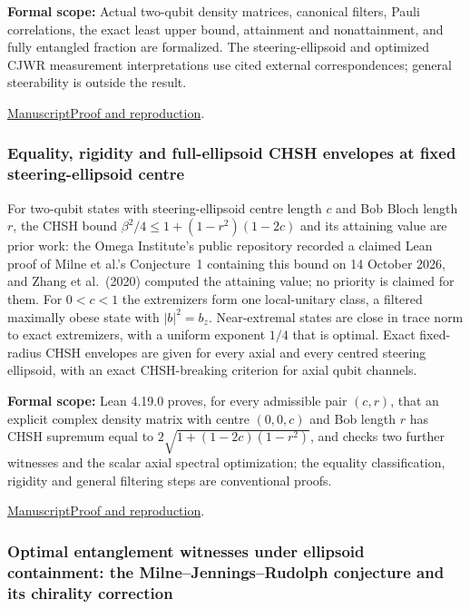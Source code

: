 \documentclass[11pt,a4paper]{article}
\begin{document}
\noindent\textbf{Formal scope:} Actual two-qubit density matrices, canonical filters, Pauli correlations, the exact least upper bound, attainment and nonattainment, and fully entangled fraction are formalized. The steering-ellipsoid and optimized CJWR measurement interpretations use cited external correspondences; general steerability is outside the result.

\href{https://github.com/dvgyl/math-and-theory/blob/main/papers/physics/steering-bounds/paper/steering_bounds.pdf}{Manuscript}\quad\href{https://github.com/dvgyl/math-and-theory/blob/main/papers/physics/steering-bounds/README.md}{Proof and reproduction}.

\subsubsection{Equality, rigidity and full-ellipsoid CHSH envelopes at fixed steering-ellipsoid centre}

For two-qubit states with steering-ellipsoid centre length $c$ and Bob Bloch length $r$, the CHSH bound $\beta^2/4\le1+(1-r^2)(1-2c)$ and its attaining value are prior work: the Omega Institute's public repository recorded a claimed Lean proof of Milne et al.'s Conjecture~1 containing this bound on 14 October 2026, and Zhang et al.\ (2020) computed the attaining value; no priority is claimed for them. For $0<c<1$ the extremizers form one local-unitary class, a filtered maximally obese state with $|b|^2=b_z$. Near-extremal states are close in trace norm to exact extremizers, with a uniform exponent $1/4$ that is optimal. Exact fixed-radius CHSH envelopes are given for every axial and every centred steering ellipsoid, with an exact CHSH-breaking criterion for axial qubit channels.

\noindent\textbf{Formal scope:} Lean 4.19.0 proves, for every admissible pair $(c,r)$, that an explicit complex density matrix with centre $(0,0,c)$ and Bob length $r$ has CHSH supremum equal to $2\sqrt{1+(1-2c)(1-r^2)}$, and checks two further witnesses and the scalar axial spectral optimization; the equality classification, rigidity and general filtering steps are conventional proofs.

\href{https://github.com/dvgyl/math-and-theory/blob/main/papers/physics/chsh-steering-ellipsoid/manuscript.pdf}{Manuscript}\quad\href{https://github.com/dvgyl/math-and-theory/blob/main/papers/physics/chsh-steering-ellipsoid/README.md}{Proof and reproduction}.

\subsubsection{Optimal entanglement witnesses under ellipsoid containment: the Milne--Jennings--Rudolph conjecture and its chirality correction}
\end{document}
